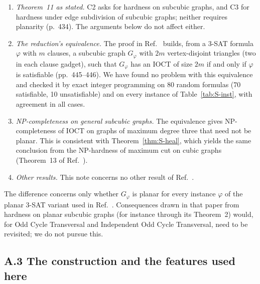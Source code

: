 \documentclass[aps,pre,onecolumn,superscriptaddress,nofootinbib]{revtex4-2}
\theoremstyle{remark}
\begin{document}
\begin{enumerate}
\item \emph{Theorem~11 as stated.} C2 asks for hardness on subcubic graphs, and C3 for hardness
under edge subdivision of subcubic graphs; neither requires planarity (p.~434). The arguments
below do not affect either.
\item \emph{The reduction's equivalence.} The proof in Ref.~\cite{Johnson2025} builds, from a
3-SAT formula $\varphi$ with $m$ clauses, a subcubic graph $G_\varphi$ with $2m$ vertex-disjoint
triangles (two in each clause gadget), such that $G_\varphi$ has an IOCT of size $2m$ if and only
if $\varphi$ is satisfiable (pp.~445--446). We
have found no problem with this equivalence and checked it by exact integer programming on 80
random formulas (70 satisfiable, 10 unsatisfiable) and on every instance of Table~\ref{tab:S-inst},
with agreement in all cases.
\item \emph{NP-completeness on general subcubic graphs.} The equivalence gives NP-completeness of
IOCT on graphs of maximum degree three that need not be planar. This is consistent with
Theorem~\ref{thm:S-heal}, which yields the same conclusion from the NP-hardness of maximum cut on
cubic graphs (Theorem~13 of Ref.~\cite{Yannakakis1978}).
\item \emph{Other results.} This note concerns no other result of Ref.~\cite{Johnson2025}.
\end{enumerate}
The difference concerns only whether $G_\varphi$ is planar for every instance $\varphi$ of the
planar 3-SAT variant used in Ref.~\cite{Johnson2025}. Consequences drawn in that paper from
hardness on planar subcubic graphs (for instance through its Theorem~2) would, for Odd Cycle
Transversal and Independent Odd Cycle Transversal, need to be revisited; we do not pursue this.

\subsection*{A.3 The construction and the features used here}
\end{document}
